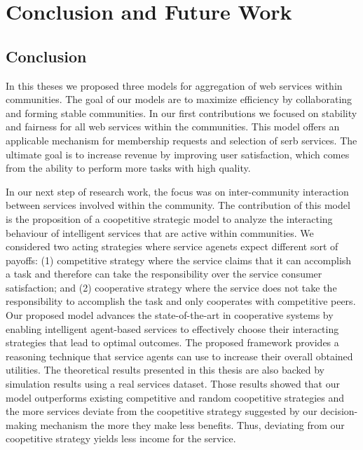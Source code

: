 \chapter{Conclusion and Future Work}\label{Chap5:Conclusion}

\section{Conclusion}

In this theses we proposed three models for aggregation of web services within communities. The goal of our models are to maximize efficiency by collaborating and forming stable communities. In our first contributions we focused on stability and fairness for all web services within the communities. This model offers an applicable mechanism for membership requests and selection of serb services. The ultimate goal is to increase revenue by improving user satisfaction, which comes from the ability to perform more tasks with high quality.

In our next step of research work, the focus was on inter-community interaction between services involved within the community. The contribution of this model is the proposition of a coopetitive strategic model to analyze the interacting behaviour of intelligent services that are active within communities. We considered two acting strategies where service agenets expect different sort of payoffs: (1) competitive strategy where the service claims that it can accomplish a task and therefore can take the responsibility over the service consumer satisfaction; and (2) cooperative strategy where the service does not take the responsibility to accomplish the task and only cooperates with competitive peers. Our proposed model advances the state-of-the-art in cooperative systems by enabling intelligent agent-based services to effectively choose their interacting strategies that lead to optimal outcomes. The proposed framework provides a reasoning technique that service agents can use to increase their overall obtained utilities. The theoretical results presented in this thesis are also backed by simulation results using a real services dataset. Those results showed that our model outperforms existing competitive and random coopetitive strategies and the more
services deviate from the coopetitive strategy suggested by our decision-making mechanism the more they make less benefits. Thus, deviating from our coopetitive strategy yields less income for the service.

